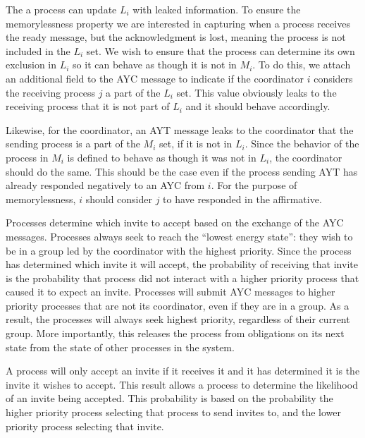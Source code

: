 The a process can update $L_i$ with leaked information.
To ensure the memorylessness property we are interested in capturing when a process receives the ready message, but the acknowledgment is lost, meaning the process is not included in the $L_i$ set.
We wish to ensure that the process can determine its own exclusion in $L_i$ so it can behave as though it is not in $M_i$.
To do this, we attach an additional field to the \ac{AYC} message to indicate if the coordinator $i$ considers the receiving process $j$ a part of the $L_i$ set.
This value obviously leaks to the receiving process that it is not part of $L_i$ and it should behave accordingly.

Likewise, for the coordinator, an \ac{AYT} message leaks to the coordinator that the sending process is a part of the $M_i$ set, if it is not in $L_i$.
Since the behavior of the process in $M_i$ is defined to behave as though it was not in $L_i$, the coordinator should do the same.
This should be the case even if the process sending \ac{AYT} has already responded negatively to an \ac{AYC} from $i$.
For the purpose of memorylessness, $i$ should consider $j$ to have responded in the affirmative.

Processes determine which invite to accept based on the exchange of the \ac{AYC} messages.
Processes always seek to reach the ``lowest energy state'': they wish to be in a group led by the coordinator with the highest priority.
Since the process has determined which invite it will accept, the probability of receiving that invite is the probability that process did not interact with a higher priority process that caused it to expect an invite.
Processes will submit AYC messages to higher priority processes that are not its coordinator, even if they are in a group.
As a result, the processes will always seek highest priority, regardless of their current group.
More importantly, this releases the process from obligations on its next state from the state of other processes in the system.

A process will only accept an invite if it receives it and it has determined it is the invite it wishes to accept.
This result allows a process to determine the likelihood of an invite being accepted.
This probability is based on the probability the higher priority process selecting that process to send invites to, and the lower priority process selecting that invite.

